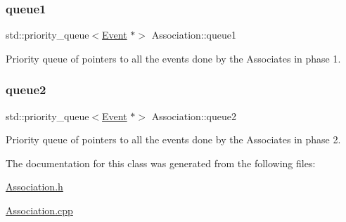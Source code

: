\subsubsection{\texorpdfstring{queue1}{queue1}}
{\footnotesize\ttfamily std\+::priority\+\_\+queue$<$\mbox{\hyperlink{classEvent}{Event}} $\ast$$>$ Association\+::queue1\hspace{0.3cm}{\ttfamily [private]}}



Priority queue of pointers to all the events done by the Associates in phase 1. 

\mbox{\label{classAssociation_ab67c6667f1fda8a6c97e7a7f2c79be2f}} 
\subsubsection{\texorpdfstring{queue2}{queue2}}
{\footnotesize\ttfamily std\+::priority\+\_\+queue$<$\mbox{\hyperlink{classEvent}{Event}} $\ast$$>$ Association\+::queue2\hspace{0.3cm}{\ttfamily [private]}}



Priority queue of pointers to all the events done by the Associates in phase 2. 



The documentation for this class was generated from the following files\+:\begin{DoxyCompactItemize}
\item 
\mbox{\hyperlink{Association_8h}{Association.\+h}}\item 
\mbox{\hyperlink{Association_8cpp}{Association.\+cpp}}\end{DoxyCompactItemize}
